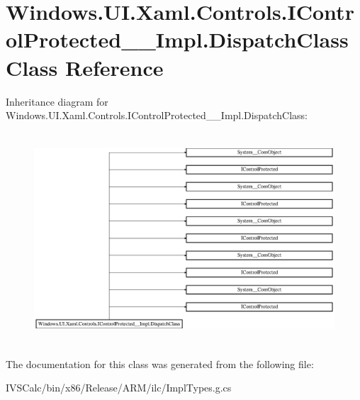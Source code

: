 \hypertarget{class_windows_1_1_u_i_1_1_xaml_1_1_controls_1_1_i_control_protected_____impl_1_1_dispatch_class}{}\section{Windows.\+U\+I.\+Xaml.\+Controls.\+I\+Control\+Protected\+\_\+\+\_\+\+Impl.\+Dispatch\+Class Class Reference}
\label{class_windows_1_1_u_i_1_1_xaml_1_1_controls_1_1_i_control_protected_____impl_1_1_dispatch_class}
Inheritance diagram for Windows.\+U\+I.\+Xaml.\+Controls.\+I\+Control\+Protected\+\_\+\+\_\+\+Impl.\+Dispatch\+Class\+:\begin{figure}[H]
\begin{center}
\leavevmode
\includegraphics[height=7.897436cm]{class_windows_1_1_u_i_1_1_xaml_1_1_controls_1_1_i_control_protected_____impl_1_1_dispatch_class}
\end{center}
\end{figure}


The documentation for this class was generated from the following file\+:\begin{DoxyCompactItemize}
\item 
I\+V\+S\+Calc/bin/x86/\+Release/\+A\+R\+M/ilc/Impl\+Types.\+g.\+cs\end{DoxyCompactItemize}
